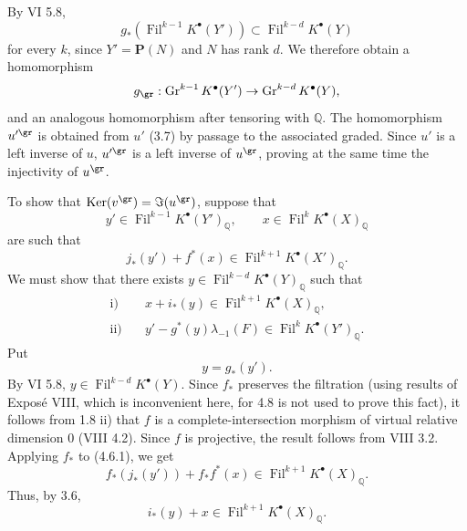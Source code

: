 \documentclass[11pt]{article}
\newcommand{\Fil}{\operatorname{Fil}}
\providecommand{\Ker}{\operatorname{Ker}}
\begin{document}
By VI 5.8,
\[
  g_*(\Fil^{k-1}K^\bullet(Y'))\subset \Fil^{k-d}K^\bullet(Y)
\]
for every \(k\), since \(Y'=\mathbf P(N)\) and \(N\) has rank \(d\). We therefore obtain a homomorphism
\[
  g_{\gr}:\operatorname{Gr}^{k-1}K^\bullet(Y')
  \to\operatorname{Gr}^{k-d}K^\bullet(Y),
\]
and an analogous homomorphism after tensoring with \(\mathbb Q\). The homomorphism \(u'^{\gr}\) is obtained from \(u'\) (3.7) by passage to the associated graded. Since \(u'\) is a left inverse of \(u\), \(u'^{\gr}\) is a left inverse of \(u^{\gr}\), proving at the same time the injectivity of \(u^{\gr}\).

To show that \(\Ker(v^{\gr})=\Im(u^{\gr})\), suppose that
\[
y'\in\Fil^{k-1}K^\bullet(Y')_{\mathbb Q},\qquad
x\in\Fil^kK^\bullet(X)_{\mathbb Q}
\]
are such that
\begin{equation}\tag{4.6.1}
  j_*(y')+f^*(x)\in\Fil^{k+1}K^\bullet(X')_{\mathbb Q}.
\end{equation}
We must show that there exists \(y\in\Fil^{k-d}K^\bullet(Y)_{\mathbb Q}\) such that
\[
\begin{aligned}
\text{i)}\quad &x+i_*(y)\in\Fil^{k+1}K^\bullet(X)_{\mathbb Q},\\
\text{ii)}\quad &y'-g^*(y)\lambda_{-1}(F)\in\Fil^{k}K^\bullet(Y')_{\mathbb Q}.
\end{aligned}
\]
Put
\[
  y=g_*(y').
\]
By VI 5.8, \(y\in\Fil^{k-d}K^\bullet(Y)\). Since \(f_*\) preserves the filtration (using results of Exposé VIII, which is inconvenient here, for 4.8 is not used to prove this fact), it follows from 1.8 ii) that \(f\) is a complete-intersection morphism of virtual relative dimension \(0\) (VIII 4.2). Since \(f\) is projective, the result follows from VIII 3.2. Applying \(f_*\) to (4.6.1), we get
\[
  f_*(j_*(y'))+f_*f^*(x)\in\Fil^{k+1}K^\bullet(X)_{\mathbb Q}.
\]
Thus, by 3.6,
\[
  i_*(y)+x\in\Fil^{k+1}K^\bullet(X)_{\mathbb Q}.
\]
\end{document}
